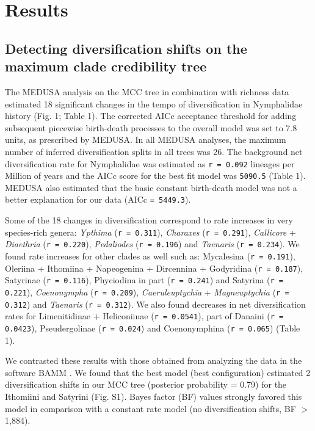 \documentclass[10pt]{article}
\begin{document}
\section*{Results}

\subsection*{Detecting diversification shifts on the maximum clade
credibility tree}

The MEDUSA analysis on the MCC tree in combination with richness data
estimated 18 significant changes in the tempo of diversification in
Nymphalidae history (Fig. 1; Table 1). The corrected AICc acceptance
threshold for adding subsequent piecewise birth-death processes to the
overall model was set to 7.8 units, as prescribed by MEDUSA. In all
MEDUSA analyses, the maximum number of inferred diversification splits
in all trees was 26. The background net diversification rate for
Nymphalidae was estimated as \texttt{r = 0.092} lineages per Million of
years and the AICc score for the best fit model was \texttt{5090.5}
(Table 1). MEDUSA also estimated that the basic constant birth-death
model was not a better explanation for our data (AICc
\texttt{= 5449.3}).

Some of the 18 changes in diversification correspond to rate increases
in very species-rich genera: \emph{Ypthima} (\texttt{r = 0.311}),
\emph{Charaxes} (\texttt{r = 0.291}), \emph{Callicore} +
\emph{Diaethria} (\texttt{r = 0.220}), \emph{Pedaliodes}
(\texttt{r = 0.196}) and \emph{Taenaris} (\texttt{r = 0.234}). We found
rate increases for other clades as well such as: Mycalesina
(\texttt{r = 0.191}), Oleriina + Ithomiina + Napeogenina + Dircennina +
Godyridina (\texttt{r = 0.187}), Satyrinae (\texttt{r = 0.116}),
Phyciodina in part (\texttt{r = 0.241}) and Satyrina
(\texttt{r = 0.221}), \emph{Coenonympha} (\texttt{r = 0.209}),
\emph{Caeruleuptychia} + \emph{Magneuptychia} (\texttt{r = 0.312}) and
\emph{Taenaris} (\texttt{r = 0.312}). We also found decreases in net
diversification rates for Limenitidinae + Heliconiinae
(\texttt{r = 0.0541}), part of Danaini (\texttt{r = 0.0423}),
Pseudergolinae (\texttt{r = 0.024}) and Coenonymphina
(\texttt{r = 0.065}) (Table 1).

We contrasted these results with those obtained from analyzing the data
in the software BAMM \cite{rabosky2014}. We found that the best model (best
configuration) estimated 2 diversification shifts in our MCC tree
(posterior probability = 0.79) for the Ithomiini and Satyrini (Fig. S1).
Bayes factor (BF) values strongly favored this model in comparison with
a constant rate model (no diversification shifts, BF \(>\) 1,884).
\end{document}
